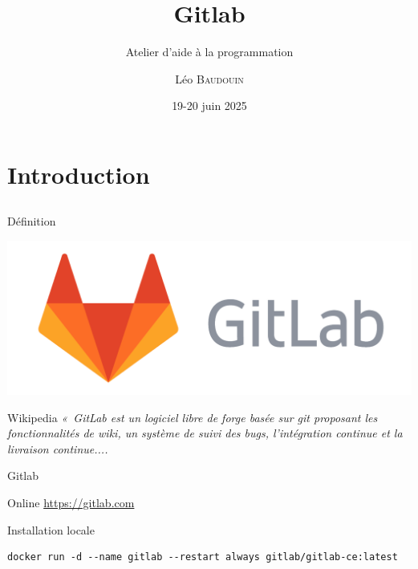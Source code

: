\documentclass{beamer}
\title{Gitlab}
\subtitle{Atelier d'aide à la programmation}
\author{L\'eo \textsc{Baudouin}}
\institute{
  {\url{baudouin.leo @ gmail.com}}
}
\date{19-20 juin 2025}
\begin{document}
\begin{frame}
  \titlepage
\end{frame}

\section{Introduction}
\subsection{}

\begin{frame}{Définition}


\begin{center}
\includegraphics[width=0.5\linewidth]{images/gitlab-logo}
\end{center}

\begin{block}{Wikipedia}
{\it 
«~GitLab est un logiciel libre de forge basée sur git proposant les fonctionnalités de wiki, un système de suivi des bugs, l’intégration continue et la livraison continue....}
\end{block}
\end{frame}



\begin{frame}[fragile]{Gitlab}

\begin{block}{Online}
\href{https://gitlab.com}{https://gitlab.com}
\end{block}

\begin{block}{Installation locale}
\scriptsize
\begin{verbatim}
docker run -d --name gitlab --restart always gitlab/gitlab-ce:latest
\end{verbatim}
\end{block}


\end{frame}
\end{document}
